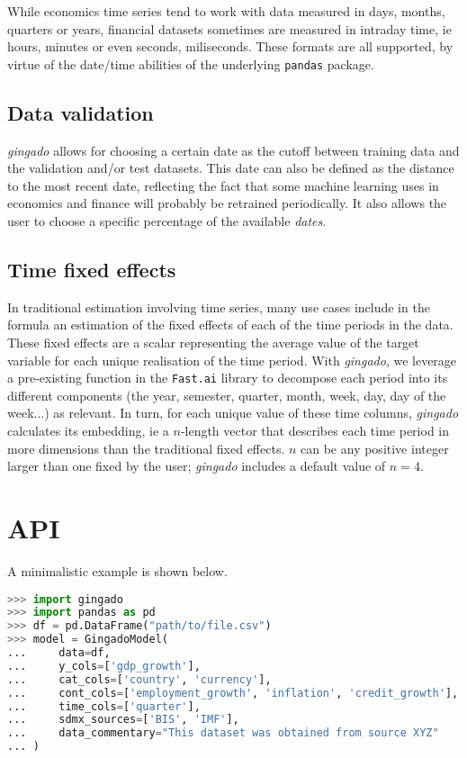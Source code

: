 \documentclass{article}
\begin{document}
While economics time series tend to work with data measured in days, months, quarters or years, financial datasets sometimes are measured in intraday time, ie hours, minutes or even seconds, miliseconds. These formats are all supported, by virtue of the date/time abilities of the underlying \texttt{pandas} package.

\subsection{Data validation}

\textit{gingado} allows for choosing a certain date as the cutoff between training data and the validation and/or test datasets. This date can also be defined as the distance to the most recent date, reflecting the fact that some machine learning uses in economics and finance will probably be retrained periodically. It also allows the user to choose a specific percentage of the available \textit{dates}.

\subsection{Time fixed effects}\label{timeproc}

In traditional estimation involving time series, many use cases include in the formula an estimation of the fixed effects of each of the time periods in the data. These fixed effects are a scalar representing the average value of the target variable for each unique realisation of the time period. With \textit{gingado}, we leverage a pre-existing function in the \texttt{Fast.ai} library to decompose each period into its different components (the year, semester, quarter, month, week, day, day of the week...) as relevant. In turn, for each unique value of these time columns, \textit{gingado} calculates its embedding, ie a $n$-length vector that describes each time period in more dimensions than the traditional fixed effects. $n$ can be any positive integer larger than one fixed by the user; \textit{gingado} includes a default value of $n=4$.


\section{API}
A minimalistic example is shown below.

\begin{lstlisting}[language=Python, caption = API example, label=API]
>>> import gingado
>>> import pandas as pd
>>> df = pd.DataFrame("path/to/file.csv")
>>> model = GingadoModel(
...     data=df,
...     y_cols=['gdp_growth'],
...     cat_cols=['country', 'currency'],
...     cont_cols=['employment_growth', 'inflation', 'credit_growth'],
...     time_cols=['quarter'],
...     sdmx_sources=['BIS', 'IMF'],
...     data_commentary="This dataset was obtained from source XYZ"
... )
\end{lstlisting}
\end{document}
